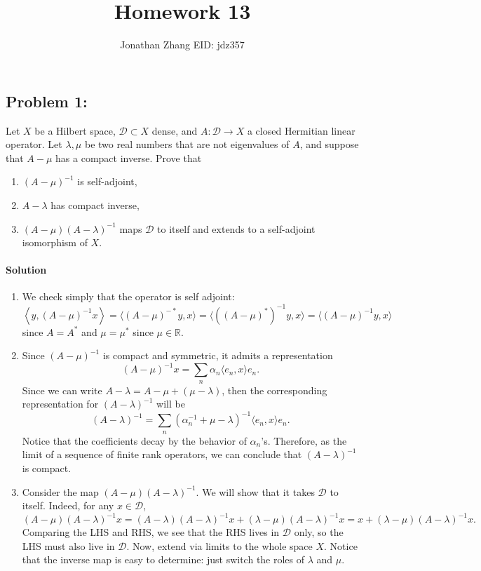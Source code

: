 \documentclass[letterpaper,twoside,11pt]{article}
\theoremstyle{mystyle}
\newcommand{\R}{{\mathbb R}}
\newcommand{\inv}{^{-1}}
\begin{document}
\title{\vspace{-2\baselineskip} 
Homework 13
}
\author{Jonathan Zhang \qquad EID: { jdz357} }
\date{}
\maketitle


\subsection*{Problem 1:}
Let $X$ be a Hilbert space, $\mathcal D \subset X$ dense, and $A: \mathcal D \to X$ a closed Hermitian linear operator. Let $\lambda, \mu$ be two real numbers that are not eigenvalues of $A$, and suppose that $A-\mu$ has a compact inverse. Prove that 
\begin{enumerate}[label=(\alph*)]
  \item $(A-\mu)^{-1}$ is self-adjoint, 
  \item $A-\lambda$ has compact inverse,
  \item $(A-\mu)(A-\lambda)^{-1}$ maps $\mathcal D$ to itself and extends to a self-adjoint isomorphism of $X$. 
\end{enumerate}

\paragraph*{Solution} 
\begin{enumerate}[label=(\alph*)]
  \item We check simply that the operator is self adjoint: 
  \[\left\langle y, (A-\mu)^{-1} x  \right\rangle = \langle (A-\mu)^{-*}y, x \rangle = \langle ((A-\mu)^*)^{-1} y, x\rangle  = \langle(A-\mu)^{-1}y, x\rangle \]
  since $A = A^*$ and $\mu = \mu^*$ since $\mu \in \R$. 
  \item Since $(A-\mu)\inv$ is compact and symmetric, it admits a representation 
  \[(A-\mu)\inv x = \sum_n \alpha_n\langle e_n, x\rangle e_n.\] Since we can write $A-\lambda = A-\mu + (\mu-\lambda)$, then the corresponding representation for $(A-\lambda)\inv$ will be \[(A-\lambda)\inv = \sum_n (\alpha_n\inv + \mu - \lambda)\inv \langle e_n, x\rangle e_n. \]
  Notice that the coefficients decay by the behavior of $\alpha_n$'s. Therefore, as the limit of a sequence of finite rank operators, we can conclude that $(A-\lambda)\inv$ is compact. 
\item Consider the map $(A-\mu)(A-\lambda)^{-1}$. We will show that it takes $\mathcal D$ to itself. Indeed, for any $x\in \mathcal D$, 
\[(A-\mu)(A-\lambda)^{-1} x = (A-\lambda)(A-\lambda)\inv x + (\lambda-\mu)(A-\lambda)\inv x= x + (\lambda-\mu)(A-\lambda)\inv x.\]
Comparing the LHS and RHS, we see that the RHS lives in $\mathcal D$ only, so the LHS must also live in $\mathcal D$. Now, extend via limits to the whole space $X$. Notice that the inverse map is easy to determine: just switch the roles of $\lambda$ and $\mu$. 

\end{enumerate}
\end{document}
